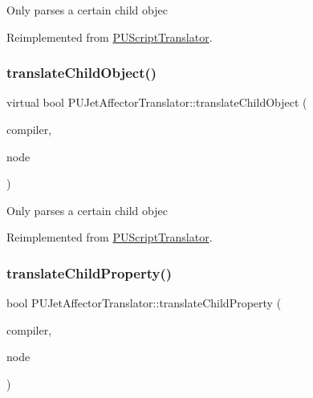 Only parses a certain child objec 

Reimplemented from \hyperlink{classPUScriptTranslator_ab587d01348ae3e678cb700c719b2b113}{P\+U\+Script\+Translator}.

\mbox{\label{classPUJetAffectorTranslator_ae289824ba17b49222cbf0ebae660edeb}} 
\subsubsection{\texorpdfstring{translate\+Child\+Object()}{translateChildObject()}\hspace{0.1cm}{\footnotesize\ttfamily [2/2]}}
{\footnotesize\ttfamily virtual bool P\+U\+Jet\+Affector\+Translator\+::translate\+Child\+Object (\begin{DoxyParamCaption}\item[{\hyperlink{classPUScriptCompiler}{P\+U\+Script\+Compiler} $\ast$}]{compiler,  }\item[{\hyperlink{classPUAbstractNode}{P\+U\+Abstract\+Node} $\ast$}]{node }\end{DoxyParamCaption})\hspace{0.3cm}{\ttfamily [virtual]}}

Only parses a certain child objec 

Reimplemented from \hyperlink{classPUScriptTranslator_ab587d01348ae3e678cb700c719b2b113}{P\+U\+Script\+Translator}.

\mbox{\label{classPUJetAffectorTranslator_a5319614653f76e46c05f3eb6a7981aa4}} 
\subsubsection{\texorpdfstring{translate\+Child\+Property()}{translateChildProperty()}\hspace{0.1cm}{\footnotesize\ttfamily [1/2]}}
{\footnotesize\ttfamily bool P\+U\+Jet\+Affector\+Translator\+::translate\+Child\+Property (\begin{DoxyParamCaption}\item[{\hyperlink{classPUScriptCompiler}{P\+U\+Script\+Compiler} $\ast$}]{compiler,  }\item[{\hyperlink{classPUAbstractNode}{P\+U\+Abstract\+Node} $\ast$}]{node }\end{DoxyParamCaption})\hspace{0.3cm}{\ttfamily [virtual]}}

